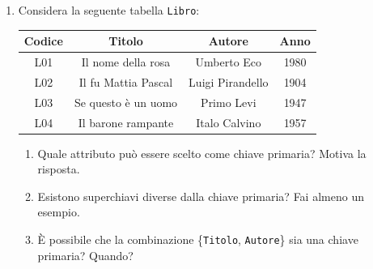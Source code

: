 \documentclass[a4paper,12pt]{article}
\begin{document}
\begin{enumerate}
%
%
%
%
%
%
%
%
%


\newpage
\item 

Considera la seguente tabella \texttt{Libro}:
\begin{center}
\begin{tabular}{|c|c|c|c|}
\hline
\textbf{Codice} & \textbf{Titolo} & \textbf{Autore} & \textbf{Anno} \\
\hline
L01 & Il nome della rosa & Umberto Eco & 1980 \\
L02 & Il fu Mattia Pascal & Luigi Pirandello & 1904 \\
L03 & Se questo è un uomo & Primo Levi & 1947 \\
L04 & Il barone rampante & Italo Calvino & 1957 \\
\hline
\end{tabular}
\end{center}

\begin{enumerate}
    \item Quale attributo può essere scelto come chiave primaria? Motiva la risposta.
    \item Esistono superchiavi diverse dalla chiave primaria? Fai almeno un esempio.
    \item È possibile che la combinazione \{\texttt{Titolo}, \texttt{Autore}\} sia una chiave primaria? Quando?
\end{enumerate}


\end{enumerate}
\end{document}
